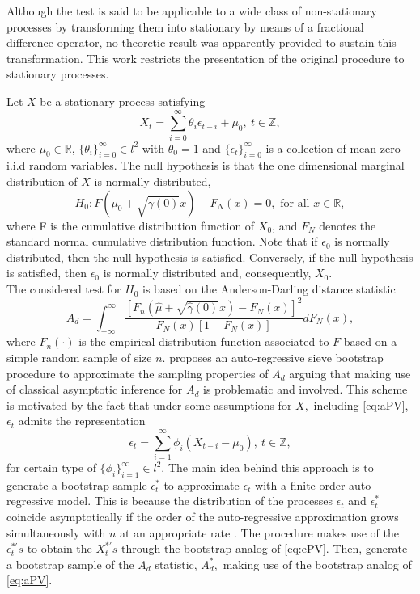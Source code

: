 Although the test is said to be applicable to a wide class of non-stationary processes by transforming them into stationary by means of a fractional difference operator, no theoretic result was apparently provided to sustain this transformation. This work restricts the presentation of the original procedure to stationary processes.

Let \(X\) be a stationary process satisfying
\begin{equation}
 X_t = \sum_{i=0}^{\infty}\theta_i \epsilon_{t-i} + \mu_0, \ t \in \mathbb{Z}, \label{eq:aPV}
\end{equation}
where \(\mu_0 \in \mathbb{R}\), \(\{\theta_i\}_{i=0}^\infty\in l^2\) with \(\theta_0 = 1\) and \(\{\epsilon_t\}_{i=0}^\infty\) is a collection of mean zero i.i.d random variables. The null hypothesis is that the one dimensional marginal distribution of \(X\) is normally distributed,
\[
 H_0: F(\mu_0 +\sqrt{\gamma(0)}x)-F_N(x) = 0, \text{ for all } x\in \mathbb{R},
\]
where F is the cumulative distribution function of \(X_0\), and \(F_N\) denotes the standard normal cumulative distribution function. Note that if \(\epsilon_0\) is normally distributed, then the null hypothesis is satisfied. Conversely, if the null hypothesis is satisfied, then \(\epsilon_0\) is normally distributed and, consequently, \(X_0\).\\
The considered test for \(H_0\) is based on the Anderson-Darling distance statistic
\begin{equation}
 A_d = \int_{-\infty}^{\infty}\dfrac{[{F_n}(\widehat{\mu}+\sqrt{\widehat{\gamma}(0)}x)-F_N(x)]^2}{F_N(x)[1-F_N(x)]}dF_N(x), \label{eq:aPV1}
\end{equation}
where \({F_n}(\cdot)\) is the empirical distribution function associated to \(F\) based on a simple random sample of size \(n\). \citet{vavra2017} proposes an auto-regressive sieve bootstrap procedure to approximate the sampling properties of \(A_d\) arguing that making use of classical asymptotic inference for \(A_d\) is problematic and involved. This scheme is motivated by the fact that under some assumptions for \(X,\) including \eqref{eq:aPV}, \(\epsilon_t\) admits the representation
\begin{equation}
 \epsilon_t = \sum_{i=1}^{\infty}\phi_i(X_{t-i} - \mu_0), \ t \in \mathbb{Z}, \label{eq:ePV}
\end{equation}
for certain type of \(\{\phi_i\}_{i=1}^\infty\in l^2\). The main idea behind this approach is to generate a bootstrap sample \(\epsilon_t^*\) to approximate \(\epsilon_t\) with a finite-order auto-regressive model. This is because the distribution of the processes \(\epsilon_t\) and \(\epsilon_t^*\) coincide asymptotically if the order of the auto-regressive approximation grows simultaneously with \(n\) at an appropriate rate \citep{Buhlmann1997}. The procedure makes use of the \(\epsilon_t^{*'}s\) to obtain the \(X_t^{*'}s\) through the bootstrap analog of \eqref{eq:ePV}. Then, generate a bootstrap sample of the \(A_d\) statistic, \(A_d^{*},\) making use of the bootstrap analog of \eqref{eq:aPV}.

